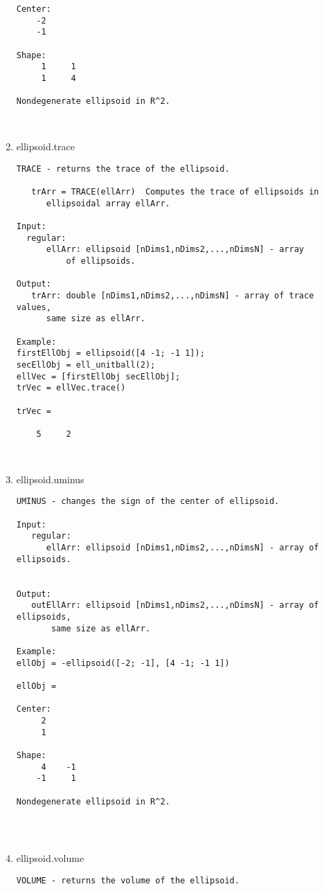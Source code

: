 \begin{enumerate}
\begin{lstlisting}
Center:
    -2
    -1

Shape:
     1     1
     1     4

Nondegenerate ellipsoid in R^2.



\end{lstlisting}
\fontfamily{\familydefault}
\selectfont
\item {ellipsoid.trace}
\selectfont
\begin{lstlisting}
TRACE - returns the trace of the ellipsoid.

   trArr = TRACE(ellArr)  Computes the trace of ellipsoids in
      ellipsoidal array ellArr.

Input:
  regular:
      ellArr: ellipsoid [nDims1,nDims2,...,nDimsN] - array
          of ellipsoids.

Output:
   trArr: double [nDims1,nDims2,...,nDimsN] - array of trace values,
      same size as ellArr.

Example:
firstEllObj = ellipsoid([4 -1; -1 1]);
secEllObj = ell_unitball(2);
ellVec = [firstEllObj secEllObj];
trVec = ellVec.trace()

trVec =

    5     2



\end{lstlisting}
\fontfamily{\familydefault}
\selectfont
\item {ellipsoid.uminus}
\selectfont
\begin{lstlisting}
UMINUS - changes the sign of the center of ellipsoid.

Input:
   regular:
      ellArr: ellipsoid [nDims1,nDims2,...,nDimsN] - array of ellipsoids.


Output:
   outEllArr: ellipsoid [nDims1,nDims2,...,nDimsN] - array of ellipsoids,
       same size as ellArr.

Example:
ellObj = -ellipsoid([-2; -1], [4 -1; -1 1])

ellObj =

Center:
     2
     1

Shape:
     4    -1
    -1     1

Nondegenerate ellipsoid in R^2.




\end{lstlisting}
\fontfamily{\familydefault}
\selectfont
\item {ellipsoid.volume}
\selectfont
\begin{lstlisting}
VOLUME - returns the volume of the ellipsoid.


\end{lstlisting}
\end{enumerate}
